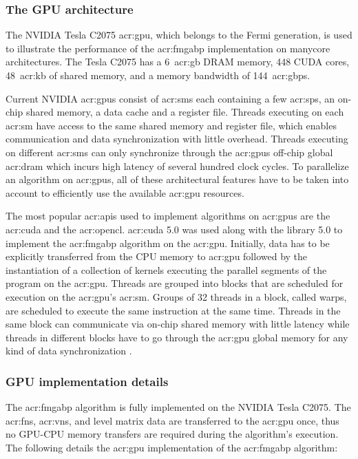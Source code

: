 \subsubsection{The GPU architecture}

The {NVIDIA} Tesla {C2075} \gls{acr:gpu}, which belongs to the Fermi generation, is used to illustrate the performance of the \gls{acr:fmgabp} implementation on manycore architectures.
The Tesla {C2075} has a 6~\gls{acr:gb} {DRAM} memory, 448 {CUDA} cores, 48~\gls{acr:kb} of shared memory, and a memory bandwidth of 144~\gls{acr:gbps}.

Current {NVIDIA} \glspl{acr:gpu} consist of \glspl{acr:sm} each containing a few \glspl{acr:sp}, an on-chip shared memory, a data cache and a register file.
Threads executing on each \gls{acr:sm} have access to the same shared memory and register file, which enables communication and data synchronization with little overhead.
Threads executing on different \glspl{acr:sm} can only synchronize through the \glspl{acr:gpu} off-chip global \gls{acr:dram} which incurs high latency of several hundred clock cycles.
To parallelize an algorithm on \glspl{acr:gpu}, all of these architectural features have to be taken into account to efficiently use the available \gls{acr:gpu} resources.

The most popular \glspl{acr:api} used to implement algorithms on \glspl{acr:gpu} are the \gls{acr:cuda} and the \gls{acr:opencl}.
\gls{acr:cuda} 5.0 was used along with the library  5.0 \cite{bib:Nvi11b} to implement the \gls{acr:fmgabp} algorithm on the \gls{acr:gpu}.
Initially, data has to be explicitly transferred from the CPU memory to \gls{acr:gpu} followed by the instantiation of a collection of kernels executing the parallel segments of the program on the \gls{acr:gpu}.
Threads are grouped into blocks that are scheduled for execution on the \gls{acr:gpu}'s \gls{acr:sm}.
Groups of 32 threads in a block, called warps, are scheduled to execute the same instruction at the same time.
Threads in the same block can communicate via on-chip shared memory with little latency while threads in different blocks have to go through the \gls{acr:gpu} global memory for any kind of data synchronization \cite{bib:Nvi11b}.


\subsubsection{GPU implementation details}
The \gls{acr:fmgabp} algorithm is fully implemented on the {NVIDIA} Tesla {C2075}.
The \glspl{acr:fn}, \glspl{acr:vn}, and level matrix data are transferred to the \gls{acr:gpu} once, thus no GPU-CPU memory transfers are required during the algorithm's execution.
The following details the \gls{acr:gpu} implementation of the \gls{acr:fmgabp} algorithm:


